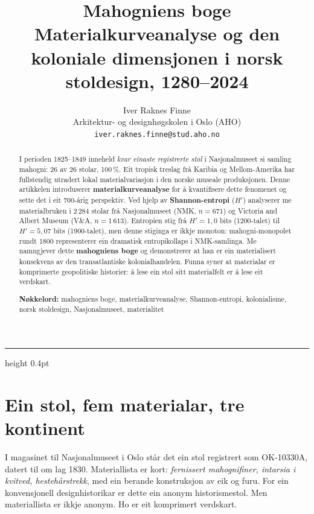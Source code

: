 \documentclass[10pt, a4paper, twocolumn]{article}
\title{%
  \textbf{Mahogniens boge}\\[0.4em]
  \large Materialkurveanalyse og den koloniale dimensjonen i norsk stoldesign, 1280--2024%
}
\author{%
  Iver Raknes Finne\\
  \small Arkitektur- og designhøgskolen i Oslo (AHO)\\
  \small \texttt{iver.raknes.finne@stud.aho.no}
}
\date{}
\begin{document}
\maketitle

\begin{abstract}
\noindent I perioden 1825--1849 inneheld \emph{kvar einaste registrerte stol} i Nasjonalmuseet si samling mahogni: 26 av 26 stolar, 100\,\%. Eit tropisk treslag frå Karibia og Mellom-Amerika har fullstendig utradert lokal materialvariasjon i den norske museale produksjonen. Denne artikkelen introduserer \textbf{materialkurveanalyse} for å kvantifisere dette fenomenet og sette det i eit 700-årig perspektiv. Ved hjelp av \textbf{Shannon-entropi} ($H'$) analyserer me materialbruken i 2\,284 stolar frå Nasjonalmuseet (NMK, $n = 671$) og Victoria and Albert Museum (V\&A, $n = 1\,613$). Entropien stig frå $H' = 1{,}0$ bits (1200-talet) til $H' = 5{,}07$ bits (1900-talet), men denne stiginga er ikkje monoton: mahogni-monopolet rundt 1800 representerer ein dramatisk entropikollaps i NMK-samlinga. Me namngjever dette \textbf{mahogniens boge} og demonstrerer at han er ein materialisert konsekvens av den transatlantiske kolonialhandelen. Funna syner at materialar er komprimerte geopolitiske historier: å lese ein stol sitt materialfelt er å lese eit verdskart.

\medskip
\noindent\textbf{Nøkkelord:} mahogniens boge, materialkurveanalyse, Shannon-entropi, kolonialisme, norsk stoldesign, Nasjonalmuseet, materialitet
\end{abstract}

\vspace{1em}
{\color{black!30}\hrule height 0.4pt}
\vspace{1.5em}


\section{Ein stol, fem materialar, tre kontinent}

I magasinet til Nasjonalmuseet i Oslo står det ein stol registrert som OK-10330A, datert til om lag 1830. Materiallista er kort: \emph{fernissert mahognifiner, intarsia i kvitved, hestehårstrekk}, med ein berande konstruksjon av eik og furu. For ein konvensjonell designhistorikar er dette ein anonym historismestol. Men materiallista er ikkje anonym. Ho er eit komprimert verdskart.
\end{document}
